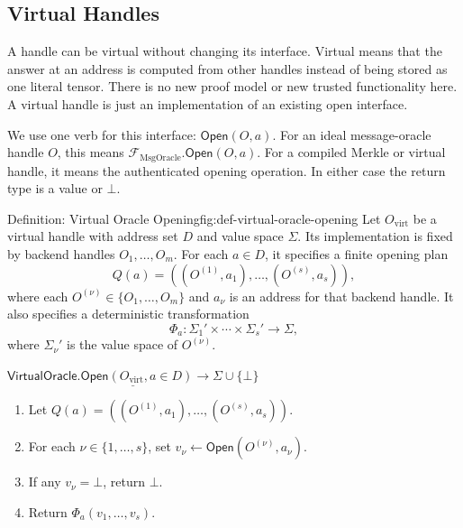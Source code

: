 \subsection{Virtual Handles}

A handle can be virtual without changing its interface.  Virtual means that the
answer at an address is computed from other handles instead of being stored as
one literal tensor.  There is no new proof model or new trusted functionality
here.  A virtual handle is just an implementation of an existing open interface.

We use one verb for this interface: \(\mathsf{Open}(O,a)\).  For an ideal
message-oracle handle \(O\), this means
\(\mathcal F_{\mathrm{MsgOracle}}.\mathsf{Open}(O,a)\).  For a compiled Merkle
or virtual handle, it means the authenticated opening operation.  In either
case the return type is a value or \(\bot\).

\begin{protocolbox}{Definition: Virtual Oracle Opening}{fig:def-virtual-oracle-opening}
Let \(O_{\mathrm{virt}}\) be a virtual handle with address set \(D\) and value
space \(\Sigma\).  Its implementation is fixed by backend handles
\(O_1,\ldots,O_m\).  For each \(a\in D\), it specifies a finite opening plan
\[
  Q(a)=((O^{(1)},a_1),\ldots,(O^{(s)},a_s)),
\]
where each \(O^{(\nu)}\in\{O_1,\ldots,O_m\}\) and \(a_\nu\) is an address for
that backend handle.  It also specifies a deterministic transformation
\[
  \Phi_a:\Sigma_1'\times\cdots\times\Sigma_s'\to\Sigma,
\]
where \(\Sigma_\nu'\) is the value space of \(O^{(\nu)}\).

\smallskip
\noindent\(\underline{\mathsf{VirtualOracle.Open}(O_{\mathrm{virt}},a\in D)\to\Sigma\cup\{\bot\}}\)

\smallskip
\begin{enumerate}[leftmargin=0.24in,label=\textbf{V\arabic*.},itemsep=0.08em,topsep=0.1em,parsep=0pt]
  \item Let \(Q(a)=((O^{(1)},a_1),\ldots,(O^{(s)},a_s))\).
  \item For each \(\nu\in\{1,\ldots,s\}\), set
        \(v_\nu\gets\mathsf{Open}(O^{(\nu)},a_\nu)\).
  \item If any \(v_\nu=\bot\), return \(\bot\).
  \item Return \(\Phi_a(v_1,\ldots,v_s)\).
\end{enumerate}
\end{protocolbox}

